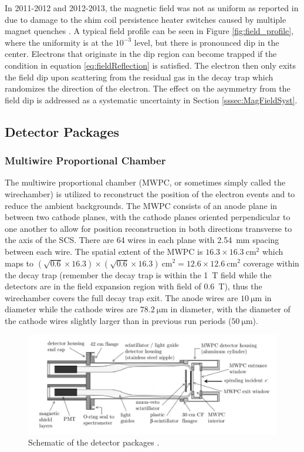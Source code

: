 In 2011-2012 and 2012-2013, the magnetic field was not as uniform as reported in 
\cite{plaster2008solenoidal} due to damage to the shim coil persistence heater switches
caused by multiple magnet quenches \cite{plaster2012}. A typical field profile can be seen
in Figure \ref{fig:field_profile}, where the uniformity is at the $10^{-3}$ level, but there is
pronounced dip in the center. Electrons
that originate in the dip region can become trapped if the condition in equation
\ref{eq:fieldReflection} is satisfied. The electron then only exits the field dip
upon scattering from the residual gas in the decay trap which randomizes the direction
of the electron. The effect
on the asymmetry from the field
dip is addressed as a systematic
uncertainty in Section \ref{sssec:MagFieldSyst}.


\subsection{Detector Packages}

\subsubsection{Multiwire Proportional Chamber} \label{sssec:ExpMWPC}

The multiwire proportional chamber (MWPC, or sometimes simply called the wirechamber)
\cite{ito2007,plaster2012} is
utilized to reconstruct the position of the electron events and to reduce the ambient
backgrounds. The MWPC consists of an anode plane in between two cathode planes, with the cathode
planes oriented perpendicular to one another to allow for position reconstruction in both directions
transverse to the axis of the SCS. There are
64 wires in each plane with 2.54~mm spacing between each wire. The spatial extent of the
MWPC is $16.3 \times 16.3\mathrm{~cm}^2$ which maps to
$ (\sqrt{0.6} \times 16.3) \times (\sqrt{0.6} \times 16.3) \mathrm{~cm}^2 = 12.6 \times 12.6\mathrm{~cm}^2$ coverage
within the decay trap (remember the decay trap is within the 1~T field while the detectors
are in the field expansion region with field of 0.6~T), thus the wirechamber covers the full
decay trap exit. The anode wires are $10\mathrm{~\mu{m}}$ in diameter while the cathode
wires are $78.2\mathrm{~\mu{m}}$ in diameter, with the diameter of the cathode wires slightly
larger than in previous run periods ($50\mathrm{~\mu{m}}$).

\begin{figure}[h]
  \centering
  \includegraphics[scale=0.6]{2-UCNAExperiment/detector_setup.pdf} 
  \caption{Schematic of the detector packages \cite{plaster2012}.}
  \label{fig:detectors}
\end{figure}


